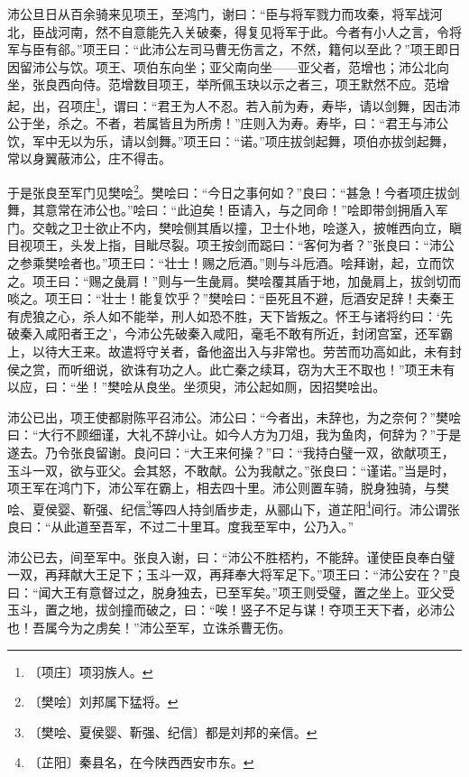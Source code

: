 \documentclass[12pt,UTF-8,openany]{ctexbook}
\begin{document}
\begin{normalsize}
    沛公旦日从百余骑来见项王，至鸿门，谢曰：“臣与将军戮力而攻秦，将军战河北，臣战河南，然不自意能先入关破秦，得复见将军于此。今者有小人之言，令将军与臣有郤。”项王曰：“此沛公左司马曹无伤言之，不然，籍何以至此？”项王即日因留沛公与饮。项王、项伯东向坐；亚父南向坐——亚父者，范增也；沛公北向坐，张良西向侍。范增数目项王，举所佩玉玦以示之者三，项王默然不应。范增起，出，召项庄\footnote{〔项庄〕项羽族人。}，谓曰：“君王为人不忍。若入前为寿，寿毕，请以剑舞，因击沛公于坐，杀之。不者，若属皆且为所虏！”庄则入为寿。寿毕，曰：“君王与沛公饮，军中无以为乐，请以剑舞。”项王曰：“诺。”项庄拔剑起舞，项伯亦拔剑起舞，常以身翼蔽沛公，庄不得击。
    
    于是张良至军门见樊哙\footnote{〔樊哙〕刘邦属下猛将。}。樊哙曰：“今日之事何如？”良曰：“甚急！今者项庄拔剑舞，其意常在沛公也。”哙曰：“此迫矣！臣请入，与之同命！”哙即带剑拥盾入军门。交戟之卫士欲止不内，樊哙侧其盾以撞，卫士仆地，哙遂入，披帷西向立，瞋目视项王，头发上指，目眦尽裂。项王按剑而跽曰：“客何为者？”张良曰：“沛公之参乘樊哙者也。”项王曰：“壮士！赐之卮酒。”则与斗卮酒。哙拜谢，起，立而饮之。项王曰：“赐之彘肩！”则与一生彘肩。樊哙覆其盾于地，加彘肩上，拔剑切而啖之。项王曰：“壮士！能复饮乎？”樊哙曰：“臣死且不避，卮酒安足辞！夫秦王有虎狼之心，杀人如不能举，刑人如恐不胜，天下皆叛之。怀王与诸将约曰：‘先破秦入咸阳者王之’，今沛公先破秦入咸阳，毫毛不敢有所近，封闭宫室，还军霸上，以待大王来。故遣将守关者，备他盗出入与非常也。劳苦而功高如此，未有封侯之赏，而听细说，欲诛有功之人。此亡秦之续耳，窃为大王不取也！”项王未有以应，曰：“坐！”樊哙从良坐。坐须臾，沛公起如厕，因招樊哙出。
    
    沛公已出，项王使都尉陈平召沛公。沛公曰：“今者出，未辞也，为之奈何？”樊哙曰：“大行不顾细谨，大礼不辞小让。如今人方为刀俎，我为鱼肉，何辞为？”于是遂去。乃令张良留谢。良问曰：“大王来何操？”曰：“我持白璧一双，欲献项王，玉斗一双，欲与亚父。会其怒，不敢献。公为我献之。”张良曰：“谨诺。”当是时，项王军在鸿门下，沛公军在霸上，相去四十里。沛公则置车骑，脱身独骑，与樊哙、夏侯婴、靳强、纪信\footnote{〔樊哙、夏侯婴、靳强、纪信〕都是刘邦的亲信。}等四人持剑盾步走，从郦山下，道芷阳\footnote{〔芷阳〕秦县名，在今陕西西安市东。}间行。沛公谓张良曰：“从此道至吾军，不过二十里耳。度我至军中，公乃入。”
    
    沛公已去，间至军中。张良入谢，曰：“沛公不胜桮杓，不能辞。谨使臣良奉白璧一双，再拜献大王足下；玉斗一双，再拜奉大将军足下。”项王曰：“沛公安在？”良曰：“闻大王有意督过之，脱身独去，已至军矣。”项王则受璧，置之坐上。亚父受玉斗，置之地，拔剑撞而破之，曰：“唉！竖子不足与谋！夺项王天下者，必沛公也！吾属今为之虏矣！”沛公至军，立诛杀曹无伤。
\end{normalsize}
\end{document}

